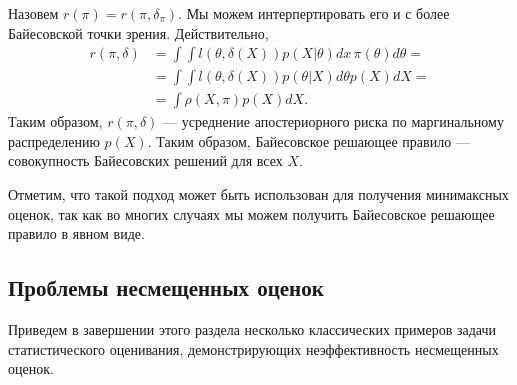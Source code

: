 Назовем $r(\pi) = r(\pi, \delta_\pi)$.
Мы можем интерпертировать его и с более Байесовской точки зрения.
Действительно, 
\begin{align*}
r(\pi, \delta) &= \int \int l(\theta, \delta(X)) p(X | \theta) dx \, \pi(\theta) d\theta = \\
&= \int \int l(\theta, \delta(X)) p(\theta | X) d\theta p(X) dX = \\
&= \int \rho(X, \pi) p(X) dX.
\end{align*}
Таким образом, $r(\pi, \delta)$ --- усреднение апостериорного риска по маргинальному распределению $p(X)$.
Таким образом, Байесовское решающее правило --- совокупность Байесовских решений для всех $X$.

Отметим, что такой подход может быть использован для получения минимаксных оценок, так как во многих случаях мы можем получить Байесовское решающее правило в явном виде.

\subsection{Проблемы несмещенных оценок}

Приведем в завершении этого раздела несколько классических примеров задачи статистического оценивания, демонстрирующих неэффективность несмещенных оценок.

